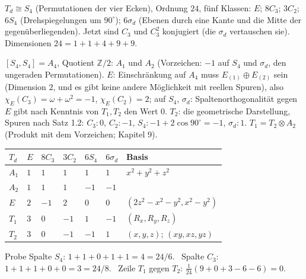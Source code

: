 \begin{merksatz}
$T_d\cong S_4$ (Permutationen der vier Ecken), Ordnung $24$, fünf Klassen: $E$; $8C_3$; $3C_2$; $6S_4$ (Drehspiegelungen um $90^{\circ}$); $6\sigma_d$ (Ebenen durch eine Kante und die Mitte der gegenüberliegenden). Jetzt sind $C_3$ und $C_3^{2}$ konjugiert (die $\sigma_d$ vertauschen sie). Dimensionen $24 = 1 + 1 + 4 + 9 + 9$.

$[S_4, S_4] = A_4$, Quotient $\mathbb Z/2$: $A_1$ und $A_2$ (Vorzeichen: $-1$ auf $S_4$ und $\sigma_d$, den ungeraden Permutationen). $E$: Einschränkung auf $A_4$ muss $E_{(1)}\oplus E_{(2)}$ sein (Dimension $2$, und es gibt keine andere Möglichkeit mit reellen Spuren), also $\chi_E(C_3) = \omega + \omega^{2} = -1$, $\chi_E(C_2) = 2$; auf $S_4$, $\sigma_d$: Spaltenorthogonalität gegen $E$ gibt nach Kenntnis von $T_1, T_2$ den Wert $0$. $T_2$: die geometrische Darstellung, Spuren nach Satz 1.2: $C_3\colon0$, $C_2\colon-1$, $S_4\colon-1 + 2\cos90^{\circ} = -1$, $\sigma_d\colon1$. $T_1 = T_2\otimes A_2$ (Produkt mit dem Vorzeichen; Kapitel 9).

\begin{center}
{\small
\renewcommand{\arraystretch}{1.46}
\begin{tabular}{@{}P{1.2cm}P{0.7cm}P{0.9cm}P{0.9cm}P{0.9cm}P{0.9cm}P{3.0cm}@{}}
\toprule
$T_d$ & $E$ & $8C_3$ & $3C_2$ & $6S_4$ & $6\sigma_d$ & \textbf{Basis}\\
\midrule
$A_1$ & $1$ & $1$ & $1$ & $1$ & $1$ & $x^{2} + y^{2} + z^{2}$\\
$A_2$ & $1$ & $1$ & $1$ & $-1$ & $-1$ & \\
$E$ & $2$ & $-1$ & $2$ & $0$ & $0$ & $(2z^{2} - x^{2} - y^{2}, x^{2} - y^{2})$\\
$T_1$ & $3$ & $0$ & $-1$ & $1$ & $-1$ & $(R_x, R_y, R_z)$\\
$T_2$ & $3$ & $0$ & $-1$ & $-1$ & $1$ & $(x, y, z)$; $(xy, xz, yz)$\\
\bottomrule
\end{tabular}}
\end{center}
Probe Spalte $S_4$: $1 + 1 + 0 + 1 + 1 = 4 = 24/6$. \checkmark\ Spalte $C_3$: $1 + 1 + 1 + 0 + 0 = 3 = 24/8$. \checkmark\ Zeile $T_1$ gegen $T_2$: $\frac1{24}(9 + 0 + 3 - 6 - 6) = 0$. \checkmark
\end{merksatz}

